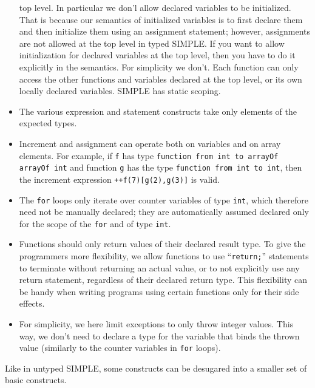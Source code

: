 \begin{latexComment}
\begin{itemize}
top level.  In particular we don'l allow declared variables to be initialized.
That is because our semantics of initialized variables is to first declare
them and then initialize them using an assignment statement; however,
assignments are not allowed at the top level in typed SIMPLE.  If you want
to allow initialization for declared variables at the top level, then you
have to do it explicitly in the semantics.  For simplicity we don't.
Each function can only access the other functions and variables declared
at the top level, or its own locally declared variables.
SIMPLE has static scoping.
\item The various expression and statement constructs take only elements of
the expected types.
\item Increment and assignment can operate both on variables and on array
elements.  For example, if \texttt{f} has type
\texttt{function from int to arrayOf arrayOf int} and function
\texttt{g} has the type \texttt{function from int to int}, then the
increment expression \texttt{++f(7)[g(2),g(3)]} is valid.
\item The \texttt{for} loops only iterate over counter variables of type
\texttt{int}, which therefore need not be manually declared; they are
automatically assumed declared only for the scope of the \texttt{for} and of
type \texttt{int}.
\item Functions should only return values of their declared result type.
To give the programmers more flexibility, we allow functions to use
``\texttt{return;}'' statements to terminate without returning an actual
value, or to not explicitly use any return statement, regardless of their
declared return type.  This flexibility can be handy when writing programs
using certain functions only for their side effects.
\item For simplicity, we here limit exceptions to only throw integer values.
This way, we don't need to declare a type for the variable that binds the
thrown value (similarly to the counter variables in \texttt{for} loops).
\end{itemize}
Like in untyped SIMPLE, some constructs can be desugared into a smaller set of
basic constructs.
\end{latexComment}

\vspace*{3ex}
